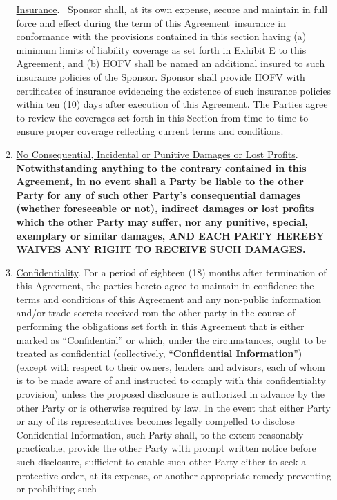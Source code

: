 \documentclass{article}
\begin{document}
\begin{enumerate}
\begin{enumerate}
    \uline{Insurance}.~ Sponsor shall, at its own expense, secure and
    maintain in full force and effect during the term of this
    Agreement~insurance in conformance with the provisions contained in
    this section having (a) minimum limits of liability coverage as set
    forth in \uline{Exhibit E} to this Agreement, and (b) HOFV shall be
    named an additional insured to such insurance policies of the
    Sponsor. Sponsor shall provide HOFV with certificates of insurance
    evidencing the existence of such insurance policies within ten (10)
    days after execution of this Agreement. The Parties agree to review
    the coverages set forth in this Section from time to time to ensure
    proper coverage reflecting current terms and conditions.
  \item
    \uline{No Consequential, Incidental or Punitive Damages or Lost
    Profits}. \textbf{Notwithstanding anything to the contrary contained
    in this Agreement, in no event shall a Party be liable to the other
    Party for any of such other Party's consequential damages (whether
    foreseeable or not), indirect damages or lost profits which the
    other Party may suffer, nor any punitive, special, exemplary or
    similar damages, AND EACH PARTY HEREBY WAIVES ANY RIGHT TO RECEIVE
    SUCH DAMAGES.}
  \item
    \uline{Confidentiality}. For a period of eighteen (18) months after
    termination of this Agreement, the parties hereto agree to maintain
    in confidence the terms and conditions of this Agreement and any
    non-public information and/or trade secrets received rom the other
    party in the course of performing the obligations set forth in this
    Agreement that is either marked as ``Confidential'' or which, under
    the circumstances, ought to be treated as confidential
    (collectively, ``\textbf{Confidential Information}'') (except with
    respect to their owners, lenders and advisors, each of whom is to be
    made aware of and instructed to comply with this confidentiality
    provision) unless the proposed disclosure is authorized in advance
    by the other Party or is otherwise required by law. In the event
    that either Party or any of its representatives becomes legally
    compelled to disclose Confidential Information, such Party shall, to
    the extent reasonably practicable, provide the other Party with
    prompt written notice before such disclosure, sufficient to enable
    such other Party either to seek a protective order, at its expense,
    or another appropriate remedy preventing or prohibiting such

\end{enumerate}
\end{enumerate}
\end{document}
